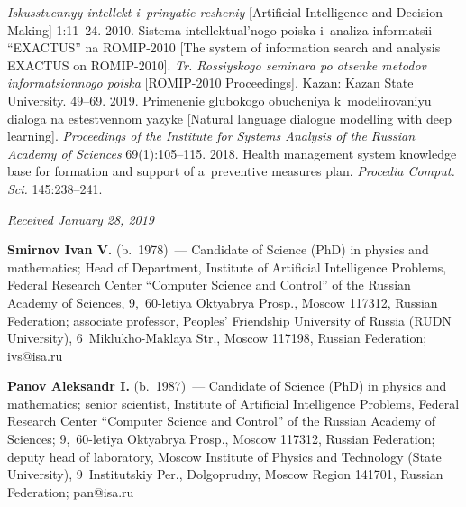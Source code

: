 \begin{multicols}{2}
{{\begin{thebibliography}{99}
\textit{Iskusstvennyy 
intellekt i~prinyatie resheniy} [Artificial Intelligence and Decision Making] 1:11--24.
   2010. 
Sistema intellektual'nogo poiska i~analiza informatsii \mbox{``EXACTUS''} na ROMIP-2010 
[The system of information search and analysis EXACTUS on ROMIP-2010]. 
\textit{Tr. Rossiyskogo seminara po otsenke metodov informatsionnogo poiska} 
[ROMIP-2010 Proceedings]. Kazan: Kazan State University. 49--69.
   2019. 
  Primenenie 
glubokogo obucheniya k~mo\-de\-li\-ro\-va\-niyu dialoga na estestvennom yazyke [Natural 
language dialogue modelling with deep learning]. 
\textit{Proceedings of the Institute for Systems Analysis of the Russian Academy of 
Sciences} 69(1):105--115. 
   2018. Health management system knowledge base for formation and 
support of a~preventive measures plan. \textit{Procedia Comput. Sci.} 145:238--241.
\end{thebibliography}

 }
 }

\end{multicols}


\hfill{\small\textit{Received January 28, 2019}}


  
  \Contr
  
  \noindent
  \textbf{Smirnov Ivan V.} (b.\ 1978)~--- Candidate of Science (PhD) in physics 
and mathematics; Head of Department, Institute of Artificial Intelligence Problems, 
Federal Research Center ``Computer Science and Control'' of the Russian Academy 
of Sciences, 9,~60-letiya Oktyabrya Prosp., Moscow 117312, Russian Federation; 
associate professor, Peoples' Friendship University of Russia (RUDN University), 
6~Miklukho-Maklaya Str., Moscow 117198, Russian Federation; \mbox{ivs@isa.ru}
  
  \vspace*{3pt}
  
  \noindent
  \textbf{Panov Aleksandr I.} (b.\ 1987)~--- Candidate of Science (PhD) in physics 
and mathematics; senior scientist, Institute of Artificial Intelligence Problems, 
Federal Research Center ``Computer Science and Control'' of the Russian Academy 
of Sciences; 9,~60-letiya Oktyabrya Prosp., Moscow 117312, Russian Federation; 
deputy head of laboratory, Moscow Institute of Physics and Technology (State 
University), 9~Institutskiy Per., Dolgoprudny, Moscow Region 141701, Russian Federation; 
\mbox{pan@isa.ru}
  
